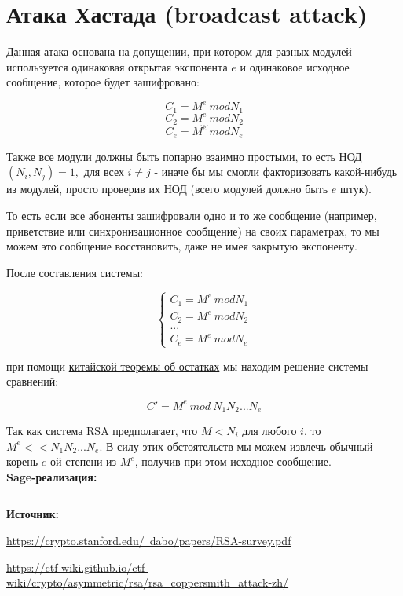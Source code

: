 \documentclass[12pt,a4paper]{scrartcl}
\begin{document}
\section{Атака Хастада (broadcast attack)}

Данная атака основана на допущении, при котором для разных модулей используется одинаковая открытая экспонента $e$ и одинаковое исходное сообщение, которое будет зашифровано: 

$$C_1 = M^e\ mod N_1$$
$$C_2 = M^e\ mod N_2$$
$$...$$
$$C_e = M^e\ mod N_e$$

Также все модули должны быть попарно взаимно простыми, то есть  НОД$(N_i, N_j) = 1,$ для всех $i\neq j$ - иначе бы мы смогли факторизовать какой-нибудь из модулей, просто проверив их НОД (всего модулей должно быть $e$ штук).

То есть если все абоненты зашифровали одно и то же сообщение (например, приветствие или синхронизационное сообщение) на своих параметрах, то мы можем это сообщение восстановить, даже не имея закрытую экспоненту.

После составления системы:

$$\begin{cases} C_1 = M^e\ mod N_1 \\ C_2 = M^e\ mod N_2 \\ ... \\ C_e = M^e\ mod N_e \end{cases}$$

при помощи \href{https://yatb.kksctf.ru/}{китайской теоремы об остатках} мы находим решение системы сравнений:

$$C' = M^e\ mod\ N_1N_2...N_e$$

Так как система RSA предполагает, что $M < N_i$ для любого $i$, то $M^e << N_1N_2...N_e$.  В силу этих обстоятельств мы можем извлечь обычный корень $e$-ой степени из $M^e$, получив при этом исходное сообщение.\\

\textbf{Sage-реализация:}

\inputminted[tabsize=4,obeytabs,fontsize=\footnotesize]{python3}{./RSA_scripts/hastad.sage}

\textbf{Источник:}

\href{https://crypto.stanford.edu/~dabo/papers/RSA-survey.pdf}{https://crypto.stanford.edu/~dabo/papers/RSA-survey.pdf}

\href{https://ctf-wiki.github.io/ctf-wiki/crypto/asymmetric/rsa/rsa_coppersmith_attack-zh/}{https://ctf-wiki.github.io/ctf-wiki/crypto/asymmetric/rsa/rsa\_coppersmith\_attack-zh/}
\end{document}
